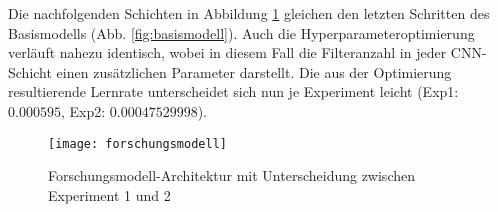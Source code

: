 Die nachfolgenden Schichten in Abbildung \ref{fig:forschungsmodell} gleichen den letzten Schritten des Basismodells (Abb. \ref{fig:basismodell}). Auch die Hyperparameteroptimierung verläuft nahezu identisch, wobei in diesem Fall die Filteranzahl in jeder CNN-Schicht einen zusätzlichen Parameter darstellt.
Die aus der Optimierung resultierende Lernrate unterscheidet sich nun je Experiment leicht (Exp1: $0.000595$, Exp2: $0.00047529998$).
\begin{figure}[H]
	\texttt{[image: forschungsmodell]}
	\caption{Forschungsmodell-Architektur mit Unterscheidung zwischen Experiment 1 und 2}
	\label{fig:forschungsmodell}
\end{figure}









